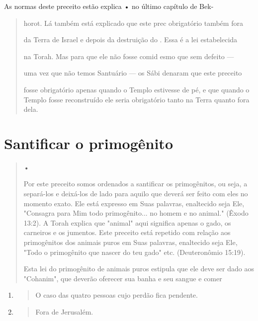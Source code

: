 As normas deste preceito estão explica • no último capítulo de Bek-

\begin{quote}
horot. Lá também está explicado que este prec obrigatório também fora

da Terra de Israel e depois da destruição do . Essa é a lei estabelecida

na Torah. Mas para que ele não fosse comid esmo que sem defeito ---

uma vez que não temos Santuário --- os Sábi denaram que este preceito

fosse obrigatório apenas quando o Templo estivesse de pé, e que quando o
Tem­plo fosse reconstruído ele seria obrigatório tanto na Terra quanto
fora dela.
\end{quote}

\section{Santificar o primogênito}

\begin{quote}
•

Por este preceito somos ordenados a santificar os primogênitos, ou seja,
a separá-los e deixá-los de lado para aquilo que deverá ser feito com
eles no momento exato. Ele está expresso em Suas palavras, enaltecido
seja Ele, "Con­sagra para Mim todo primogênito... no homem e no animal."
(Êxodo 13:2). A Torah explica que "animal" aqui significa apenas o gado,
os carneiros e os ju­mentos. Este preceito está repetido com relação aos
primogênitos dos animais puros em Suas palavras, enaltecido seja Ele,
"Todo o primogênito que nascer do teu gado" etc. (Deuteronômio 15:19).

Esta lei do primogênito de animais puros estipula que ele deve ser dado
aos "Cohanim", que deverão oferecer sua banha e seu sangue e comer
\end{quote}

\begin{enumerate}
\def\labelenumi{\arabic{enumi}.}
\setcounter{enumi}{100}
\item
 \begin{quote}
 O caso das quatro pessoas cujo perdão fica pendente.
 \end{quote}
\item
 \begin{quote}
 Fora de Jerusalém.
 \end{quote}
\end{enumerate}

